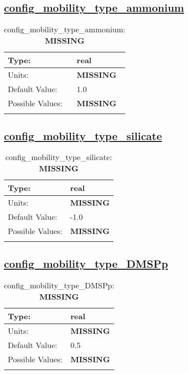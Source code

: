 \subsection[config\_mobility\_type\_ammonium]{\hyperref[sec:nm_tab_biogeochemistry]{config\_mobility\_type\_ammonium}}
\label{subsec:nm_sec_config_mobility_type_ammonium}
\begin{center}
\begin{longtable}{| p{2.0in} || p{4.0in} |}
    \hline
    Type: & real \\
    \hline
    Units: & {\bf \color{red} MISSING} \\
    \hline
    Default Value: & 1.0 \\
    \hline
    Possible Values: & {\bf \color{red} MISSING} \\
    \hline
    \caption{config\_mobility\_type\_ammonium: {\bf \color{red} MISSING}}
\end{longtable}
\end{center}
\subsection[config\_mobility\_type\_silicate]{\hyperref[sec:nm_tab_biogeochemistry]{config\_mobility\_type\_silicate}}
\label{subsec:nm_sec_config_mobility_type_silicate}
\begin{center}
\begin{longtable}{| p{2.0in} || p{4.0in} |}
    \hline
    Type: & real \\
    \hline
    Units: & {\bf \color{red} MISSING} \\
    \hline
    Default Value: & -1.0 \\
    \hline
    Possible Values: & {\bf \color{red} MISSING} \\
    \hline
    \caption{config\_mobility\_type\_silicate: {\bf \color{red} MISSING}}
\end{longtable}
\end{center}
\subsection[config\_mobility\_type\_DMSPp]{\hyperref[sec:nm_tab_biogeochemistry]{config\_mobility\_type\_DMSPp}}
\label{subsec:nm_sec_config_mobility_type_DMSPp}
\begin{center}
\begin{longtable}{| p{2.0in} || p{4.0in} |}
    \hline
    Type: & real \\
    \hline
    Units: & {\bf \color{red} MISSING} \\
    \hline
    Default Value: & 0.5 \\
    \hline
    Possible Values: & {\bf \color{red} MISSING} \\
    \hline
    \caption{config\_mobility\_type\_DMSPp: {\bf \color{red} MISSING}}
\end{longtable}
\end{center}
